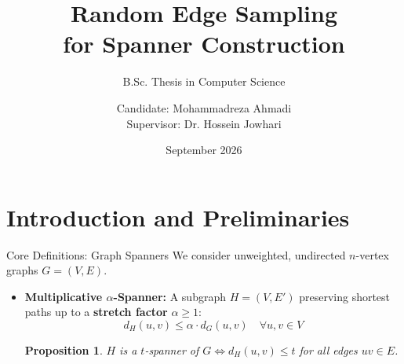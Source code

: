 \documentclass[10pt]{beamer}
\title[Independent Edge Sampling for Spanners]{Random Edge Sampling \\ for Spanner Construction}
\subtitle{B.Sc. Thesis in Computer Science}
\author[M. Ahmadi]{Candidate: Mohammadreza Ahmadi \\ \vspace{0.3cm} Supervisor: Dr. Hossein Jowhari}
\institute[KNTU]{Faculty of Mathematics \\ K. N. Toosi University of Technology}
\date{September 2026}
\newtheorem{proposition}[theorem]{Proposition}
\begin{document}
\begin{frame}
    \titlepage
\end{frame}


\section{Introduction and Preliminaries}

\begin{frame}{Core Definitions: Graph Spanners}
    We consider unweighted, undirected $n$-vertex graphs $G = (V,E)$.
    
    \vspace{0.4cm}
    \begin{itemize}
        \item \textbf{Multiplicative $\alpha$-Spanner:} A subgraph $H = (V, E')$ preserving shortest paths up to a \textbf{stretch factor} $\alpha \ge 1$:
        \[ d_H(u,v) \le \alpha \cdot d_G(u,v) \quad \forall u, v \in V \]
        
        \vspace{0.6cm}
        \begin{proposition}
            $H$ is a $t$-spanner of $G \iff d_H(u, v) \le t$ for all edges $uv \in E$.
        \end{proposition}
    \end{itemize}
\end{frame}
\end{document}

